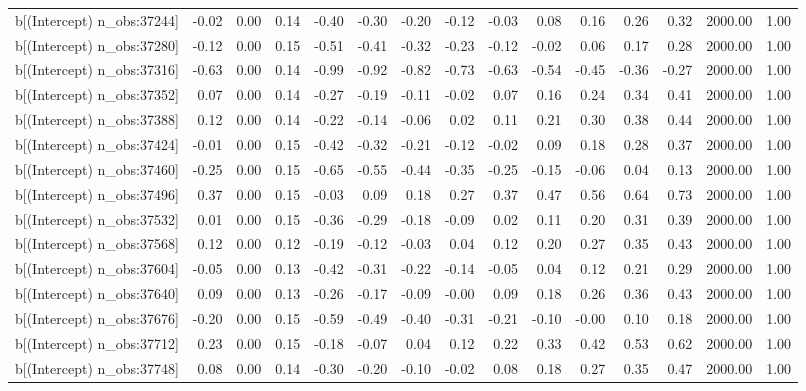 \begin{table}[ht]
\begin{tabular}{rrrrrrrrrrrrrrr}
  b[(Intercept) n\_obs:37244] & -0.02 & 0.00 & 0.14 & -0.40 & -0.30 & -0.20 & -0.12 & -0.03 & 0.08 & 0.16 & 0.26 & 0.32 & 2000.00 & 1.00 \\ 
  b[(Intercept) n\_obs:37280] & -0.12 & 0.00 & 0.15 & -0.51 & -0.41 & -0.32 & -0.23 & -0.12 & -0.02 & 0.06 & 0.17 & 0.28 & 2000.00 & 1.00 \\ 
  b[(Intercept) n\_obs:37316] & -0.63 & 0.00 & 0.14 & -0.99 & -0.92 & -0.82 & -0.73 & -0.63 & -0.54 & -0.45 & -0.36 & -0.27 & 2000.00 & 1.00 \\ 
  b[(Intercept) n\_obs:37352] & 0.07 & 0.00 & 0.14 & -0.27 & -0.19 & -0.11 & -0.02 & 0.07 & 0.16 & 0.24 & 0.34 & 0.41 & 2000.00 & 1.00 \\ 
  b[(Intercept) n\_obs:37388] & 0.12 & 0.00 & 0.14 & -0.22 & -0.14 & -0.06 & 0.02 & 0.11 & 0.21 & 0.30 & 0.38 & 0.44 & 2000.00 & 1.00 \\ 
  b[(Intercept) n\_obs:37424] & -0.01 & 0.00 & 0.15 & -0.42 & -0.32 & -0.21 & -0.12 & -0.02 & 0.09 & 0.18 & 0.28 & 0.37 & 2000.00 & 1.00 \\ 
  b[(Intercept) n\_obs:37460] & -0.25 & 0.00 & 0.15 & -0.65 & -0.55 & -0.44 & -0.35 & -0.25 & -0.15 & -0.06 & 0.04 & 0.13 & 2000.00 & 1.00 \\ 
  b[(Intercept) n\_obs:37496] & 0.37 & 0.00 & 0.15 & -0.03 & 0.09 & 0.18 & 0.27 & 0.37 & 0.47 & 0.56 & 0.64 & 0.73 & 2000.00 & 1.00 \\ 
  b[(Intercept) n\_obs:37532] & 0.01 & 0.00 & 0.15 & -0.36 & -0.29 & -0.18 & -0.09 & 0.02 & 0.11 & 0.20 & 0.31 & 0.39 & 2000.00 & 1.00 \\ 
  b[(Intercept) n\_obs:37568] & 0.12 & 0.00 & 0.12 & -0.19 & -0.12 & -0.03 & 0.04 & 0.12 & 0.20 & 0.27 & 0.35 & 0.43 & 2000.00 & 1.00 \\ 
  b[(Intercept) n\_obs:37604] & -0.05 & 0.00 & 0.13 & -0.42 & -0.31 & -0.22 & -0.14 & -0.05 & 0.04 & 0.12 & 0.21 & 0.29 & 2000.00 & 1.00 \\ 
  b[(Intercept) n\_obs:37640] & 0.09 & 0.00 & 0.13 & -0.26 & -0.17 & -0.09 & -0.00 & 0.09 & 0.18 & 0.26 & 0.36 & 0.43 & 2000.00 & 1.00 \\ 
  b[(Intercept) n\_obs:37676] & -0.20 & 0.00 & 0.15 & -0.59 & -0.49 & -0.40 & -0.31 & -0.21 & -0.10 & -0.00 & 0.10 & 0.18 & 2000.00 & 1.00 \\ 
  b[(Intercept) n\_obs:37712] & 0.23 & 0.00 & 0.15 & -0.18 & -0.07 & 0.04 & 0.12 & 0.22 & 0.33 & 0.42 & 0.53 & 0.62 & 2000.00 & 1.00 \\ 
  b[(Intercept) n\_obs:37748] & 0.08 & 0.00 & 0.14 & -0.30 & -0.20 & -0.10 & -0.02 & 0.08 & 0.18 & 0.27 & 0.35 & 0.47 & 2000.00 & 1.00 \\ 

\end{tabular}
\end{table}
